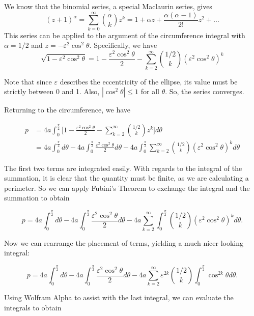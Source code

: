 \documentclass[12pt]{amsart}
\theoremstyle{case}
\begin{document}
	We know that the binomial series, a special Maclaurin series, gives
	$$ (z+1)^\alpha = \sum_{k=0}^{\infty} \binom{\alpha}{k} z^k = 1 + \alpha z + \frac{\alpha(\alpha - 1)}{2!} z^2 + \dots $$
	This series can be applied to the argument of the circumference integral with $\alpha = 1/2$ and $z = -\varepsilon^2\cos^2\theta$. Specifically, we have
	$$ \sqrt{ 1 - \varepsilon^2\cos^2\theta } = 1 - \frac{\varepsilon^2\cos^2\theta}{2} - \sum_{k=2}^{\infty} \binom{1/2}{k} (\varepsilon^2 \cos^2\theta)^k $$
	
	Note that since $\varepsilon$ describes the eccentricity of the ellipse, its value must be strictly between 0 and 1. Also, $|\cos^2\theta| \leq 1$ for all $\theta$. So, the series converges.
	
	Returning to the circumference, we have
	
	\begin{equation*}
	\begin{split}
	p & = 4a \int_{0}^{\frac{\pi}{2}} \Bigg[ 1 - \frac{\varepsilon^2\cos^2\theta}{2} - \sum_{k=2}^{\infty} \binom{1/2}{k} z^k \Bigg] d\theta \\
	& = 4a \int_{0}^{\frac{\pi}{2}} d\theta - 4a \int_{0}^{\frac{\pi}{2}} \frac{\varepsilon^2\cos^2\theta}{2} d\theta - 4a \int_{0}^{\frac{\pi}{2}} \sum_{k=2}^{\infty} \binom{1/2}{k} (\varepsilon^2 \cos^2\theta)^k d\theta
	\end{split}
	\end{equation*}
	
	The first two terms are integrated easily. With regards to the integral of the summation, it is clear that the quantity must be finite, as we are calculating a perimeter. So we can apply Fubini's Theorem to exchange the integral and the summation to obtain
	
	$$ p = 4a \int_{0}^{\frac{\pi}{2}} d\theta - 4a \int_{0}^{\frac{\pi}{2}} \frac{\varepsilon^2\cos^2\theta}{2} d\theta - 4a \sum_{k=2}^{\infty} \int_{0}^{\frac{\pi}{2}} \binom{1/2}{k} (\varepsilon^2 \cos^2\theta)^k d\theta . $$
	
	Now we can rearrange the placement of terms, yielding a much nicer looking integral:
	
	$$ p = 4a \int_{0}^{\frac{\pi}{2}} d\theta - 4a \int_{0}^{\frac{\pi}{2}} \frac{\varepsilon^2\cos^2\theta}{2} d\theta - 
	4a \sum_{k=2}^{\infty} \varepsilon^{2k} \binom{1/2}{k} \int_{0}^{\frac{\pi}{2}} \cos^{2k}\theta d\theta . $$
	
	Using Wolfram Alpha to assist with the last integral, we can evaluate the integrals to obtain
	
\end{document}

